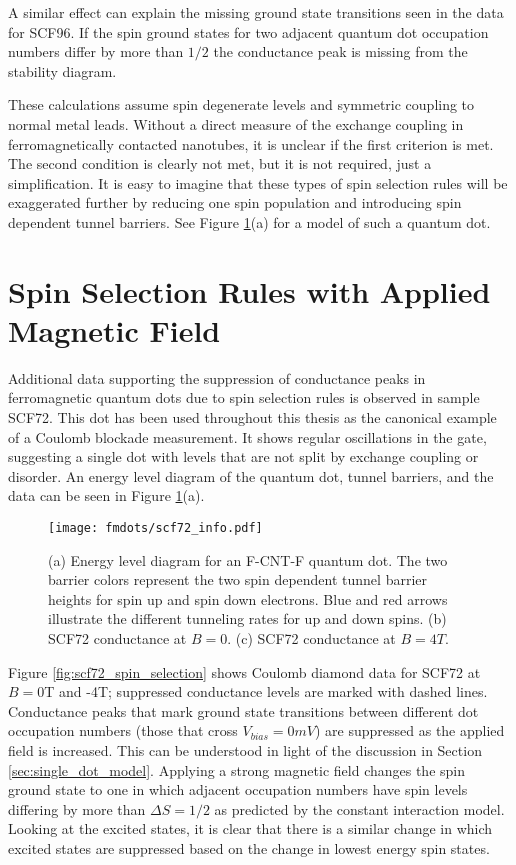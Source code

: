 A similar effect can explain the missing ground state transitions seen in the data for SCF96. If the spin ground states for two adjacent quantum dot occupation numbers differ by more than $1/2$ the conductance peak is missing from the stability diagram.

These calculations assume spin degenerate levels and symmetric coupling to normal metal leads. Without a direct measure of the exchange coupling in ferromagnetically contacted nanotubes, it is unclear if the first criterion is met. The second condition is clearly not met, but it is not required, just a simplification. It is easy to imagine that these types of spin selection rules will be exaggerated further by reducing one spin population and introducing spin dependent tunnel barriers. See Figure \ref{fig:scf72_info}(a) for a model of such a quantum dot.

\section{Spin Selection Rules with Applied Magnetic Field}
\label{sec:spin_selection_field}

Additional data supporting the suppression of conductance peaks in ferromagnetic quantum dots due to spin selection rules is observed in sample SCF72. This dot has been used throughout this thesis as the canonical example of a Coulomb blockade measurement. It shows regular oscillations in the gate, suggesting a single dot with levels that are not split by exchange coupling or disorder. An energy level diagram of the quantum dot, tunnel barriers, and the data can be seen in Figure \ref{fig:scf72_info}(a). 

\begin{figure}
    \centering
    \texttt{[image: fmdots/scf72\_info.pdf]}
    \caption{(a) Energy level diagram for an F-CNT-F quantum dot. The two barrier colors represent the two spin dependent tunnel barrier heights for spin up and spin down electrons. Blue and red arrows illustrate the different tunneling rates for up and down spins. (b) SCF72 conductance at $B=0$. (c) SCF72 conductance at $B=4T$.}
    \label{fig:scf72_info}
\end{figure}

Figure \ref{fig:scf72_spin_selection} shows Coulomb diamond data for SCF72 at $B=0$T and -4T; suppressed conductance levels are marked with dashed lines. Conductance peaks that mark ground state transitions between different dot occupation numbers (those that cross $V_{bias}=0mV$) are suppressed as the applied field is increased. This can be understood in light of the discussion in Section \ref{sec:single_dot_model}. Applying a strong magnetic field changes the spin ground state to one in which adjacent occupation numbers have spin levels differing by more than $\Delta S = 1/2$ as predicted by the constant interaction model. Looking at the excited states, it is clear that there is a similar change in which excited states are suppressed based on the change in lowest energy spin states.

